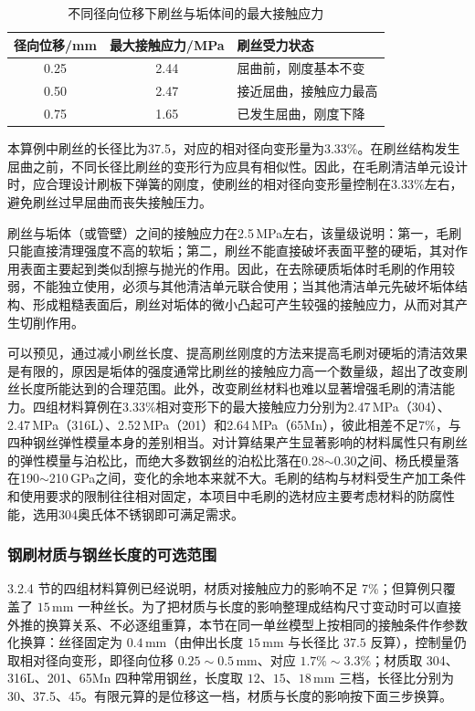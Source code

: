 \begin{table}[H]
	\centering
	\caption{不同径向位移下刷丝与垢体间的最大接触应力}
	\label{tab:brush_contact_stress}
	\renewcommand{\arraystretch}{1.3}
	\begin{tabularx}{0.85\textwidth}{cc>{\raggedright\arraybackslash}X}
		\toprule
		径向位移/mm & 最大接触应力/MPa & 刷丝受力状态 \\
		\midrule
		0.25 & 2.44 & 屈曲前，刚度基本不变 \\
		0.50 & 2.47 & 接近屈曲，接触应力最高 \\
		0.75 & 1.65 & 已发生屈曲，刚度下降 \\
		\bottomrule
	\end{tabularx}
\end{table}

本算例中刷丝的长径比为37.5，对应的相对径向变形量为3.33\%。在刷丝结构发生屈曲之前，不同长径比刷丝的变形行为应具有相似性。因此，在毛刷清洁单元设计时，应合理设计刷板下弹簧的刚度，使刷丝的相对径向变形量控制在3.33\%左右，避免刷丝过早屈曲而丧失接触压力。

刷丝与垢体（或管壁）之间的接触应力在2.5\,MPa左右，该量级说明：第一，毛刷只能直接清理强度不高的软垢；第二，刷丝不能直接破坏表面平整的硬垢，其对作用表面主要起到类似刮擦与抛光的作用。因此，在去除硬质垢体时毛刷的作用较弱，不能独立使用，必须与其他清洁单元联合使用；当其他清洁单元先破坏垢体结构、形成粗糙表面后，刷丝对垢体的微小凸起可产生较强的接触应力，从而对其产生切削作用。

可以预见，通过减小刷丝长度、提高刷丝刚度的方法来提高毛刷对硬垢的清洁效果是有限的，原因是垢体的强度通常比刷丝的接触应力高一个数量级，超出了改变刷丝长度所能达到的合理范围。此外，改变刷丝材料也难以显著增强毛刷的清洁能力。四组材料算例在3.33\%相对变形下的最大接触应力分别为2.47\,MPa（304）、2.47\,MPa（316L）、2.52\,MPa（201）和2.64\,MPa（65Mn），彼此相差不足7\%，与四种钢丝弹性模量本身的差别相当。对计算结果产生显著影响的材料属性只有刷丝的弹性模量与泊松比，而绝大多数钢丝的泊松比落在0.28$\sim$0.30之间、杨氏模量落在190$\sim$210\,GPa之间，变化的余地本来就不大。毛刷的结构与材料受生产加工条件和使用要求的限制往往相对固定，本项目中毛刷的选材应主要考虑材料的防腐性能，选用304奥氏体不锈钢即可满足需求。

\subsubsection{钢刷材质与钢丝长度的可选范围}
\label{subsec:brush_material_length}

3.2.4 节的四组材料算例已经说明，材质对接触应力的影响不足 7\%；但算例只覆盖了 $15\,\mathrm{mm}$ 一种丝长。为了把材质与长度的影响整理成结构尺寸变动时可以直接外推的换算关系、不必逐组重算，本节在同一单丝模型上按相同的接触条件作参数化换算：丝径固定为 $0.4\,\mathrm{mm}$（由伸出长度 $15\,\mathrm{mm}$ 与长径比 $37.5$ 反算），控制量仍取相对径向变形，即径向位移 $0.25\sim0.5\,\mathrm{mm}$、对应 $1.7\%\sim3.3\%$；材质取 304、316L、201、65Mn 四种常用钢丝，长度取 $12$、$15$、$18\,\mathrm{mm}$ 三档，长径比分别为 30、37.5、45。有限元算的是位移这一档，材质与长度的影响按下面三步换算。

